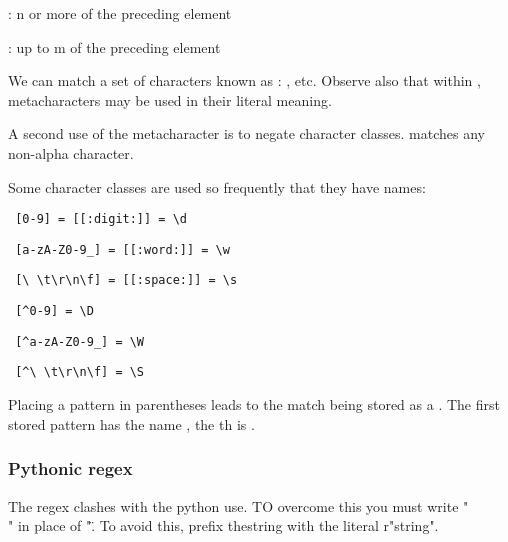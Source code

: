 \begin{compactitem}
\begin{compactitem}
\item {}: n or more of the preceding element
\item {}: up to m of the preceding element
\end{compactitem}
\item We can match a set of characters known as : \e{[0-9],[a-z],[A-Z],[A-Za-z],[aeiou]}, etc.
Observe also that within \e{[]}, metacharacters may be used in their literal
meaning. 
\item A second use of the \e{\textasciicircum{}} metacharacter is to negate character classes.
\e{/[\textasciicircum{}A-Za-z]/} matches any non-alpha character.
\item Some character classes are used so frequently that they have names:
\begin{compactitem}
\item \begin{verbatim} [0-9] = [[:digit:]] = \d \end{verbatim}
\item \begin{verbatim} [a-zA-Z0-9_] = [[:word:]] = \w \end{verbatim}
\item \begin{verbatim} [\ \t\r\n\f] = [[:space:]] = \s \end{verbatim}
\item \begin{verbatim} [^0-9] = \D \end{verbatim}
\item \begin{verbatim} [^a-zA-Z0-9_] = \W \end{verbatim}
\item \begin{verbatim} [^\ \t\r\n\f] = \S \end{verbatim}
\end{compactitem}

\item Placing a pattern in parentheses leads to the match being stored as a
.
The first stored pattern has the name , the th is . 
\end{compactitem}

\subsubsection{Pythonic regex}
The regex  clashes with the python use. TO overcome this you must write "\\" in place of "\". To avoid this, prefix thestring with the literal r"string".

